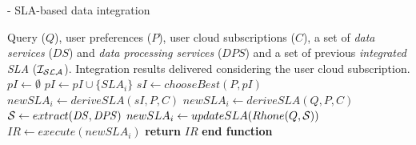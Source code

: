 \begin{algorithm} 
\caption{ - SLA-based data integration}
\label{qualityBasedAlgorithm}
\begin{algorithmic}[1]
\REQUIRE Query ($Q$), user preferences ($P$), user cloud subscriptions ($C$), a
set of \textit{data services} ($\mathit{DS}$) and \textit{data processing services} ($\mathit{DPS}$) and a set of previous \textit{integrated SLA} ($\bigSLA$).
\ENSURE Integration results delivered considering the user cloud subscription.
\STATE $pI \leftarrow \emptyset$
		\STATE $pI \leftarrow pI \cup \lbrace SLA_{i} \rbrace$		
	\ENDIF
\ENDFOR
{}
	\STATE $sI \leftarrow chooseBest(P, pI)$
	\STATE $newSLA_{i} \leftarrow deriveSLA(sI, P, C)$
\ELSE
	\STATE $newSLA_{i} \leftarrow deriveSLA(Q, P, C)$
	\STATE $\bigS \leftarrow extract(\mathit{DS}, \mathit{DPS})$
	\STATE $newSLA_{i} \leftarrow updateSLA(Rhone(Q, \bigS))$
\ENDIF
\STATE $IR \leftarrow execute(newSLA_{i})$
\STATE \textbf{return} $IR$
\STATE \textbf{end function}
\end{algorithmic}
\end{algorithm} 

